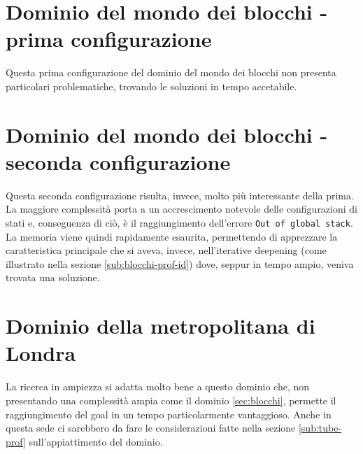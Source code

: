 \section{Dominio del mondo dei blocchi - prima configurazione}
Questa prima configurazione del dominio del mondo dei blocchi non presenta particolari problematiche, trovando le soluzioni in tempo accetabile.

\section{Dominio del mondo dei blocchi - seconda configurazione} \label{sec:2-blocchi-amp}
Questa seconda configurazione risulta, invece, molto più interessante della prima. La maggiore complessità porta a un accrescimento notevole delle configurazioni di stati e, conseguenza di ciò, è il raggiungimento dell'errore \texttt{Out of global stack}. La memoria viene quindi rapidamente esaurita, permettendo di apprezzare la caratteristica principale che si aveva, invece, nell'iterative deepening (come illustrato nella sezione \ref{sub:blocchi-prof-id}) dove, seppur in tempo ampio, veniva trovata una soluzione.

\section{Dominio della metropolitana di Londra} \label{sec:tube-amp}
La ricerca in ampiezza si adatta molto bene a questo dominio che, non presentando una complessità ampia come il dominio \ref{sec:blocchi}, permette il raggiungimento del goal in un tempo particolarmente vantaggioso. Anche in questa sede ci sarebbero da fare le considerazioni fatte nella sezione \ref{sub:tube-prof} sull'appiattimento del dominio.
